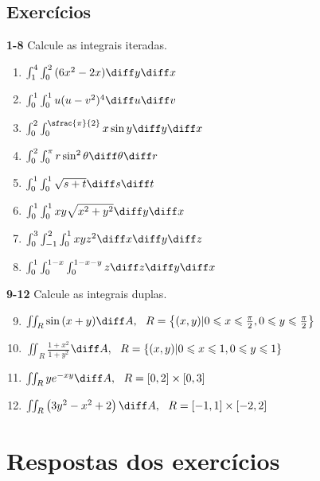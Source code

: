 \documentclass[a4paper, 12pt]{extreport}
\begin{document}
      \section{Exercícios}
      {\color{astral}\textbf{1-8}} Calcule as integrais iteradas.
        \begin{multicols}{2}
          \begin{enumerate}
            \item $\int_1^4{\int_0^2{(6x^2-2x)\diff y}\diff x}$
            \item $\int_0^1{\int_0^1{u(u-v^2)^4\diff u}\diff v}$
            \item $\int_0^2{\int_0^{\sfrac{\pi}{2}}{x\sin{y}\diff y}\diff x}$
            \item $\int_0^2{\int_0^{\pi}{r\sin^2{\theta}\diff\theta}\diff r}$
            \item $\int_0^1{\int_0^1{\sqrt{s+t}\diff s}\diff t}$
            \item $\int_0^1{\int_0^1{xy\sqrt{x^2+y^2}\diff y}\diff x}$
            \item $\int_0^3{\int_{-1}^2{\int_0^1{xyz^2}\diff x}\diff y}\diff z$
            \item $\int_0^1{\int_0^{1-x}{\int_0^{1-x-y}{z}\diff z}\diff y}\diff x$
          \end{enumerate}
        \end{multicols}

      \vspace{5mm}

      {\color{astral}\textbf{9-12}} Calcule as integrais duplas.
        \begin{enumerate}
          \setcounter{enumi}{8}
          \item $\iint_R{\sin{(x+y)}\diff A}, \ \ R = \left\{(x,y)|0 \leqslant x \leqslant \frac{\pi}{2}, 0 \leqslant y \leqslant \frac{\pi}{2}\right\}$
          \item $\iint_R$\large$\frac{1+x^2}{1+y^2}$\normalsize$\diff A, \ \ R = \left\{(x,y)|0 \leqslant x \leqslant 1, 0 \leqslant y \leqslant 1\right\}$
          \item $\iint_R{ye^{-xy}\diff A}, \ \ R = [0,2] \times [0,3]$
          \item $\iint_R{\left(3y^2-x^2+2\right)\diff A}, \ \ R = [-1,1] \times [-2,2]$
        \end{enumerate}

  \appendix
  \chapter{Respostas dos exercícios}
\end{document}
